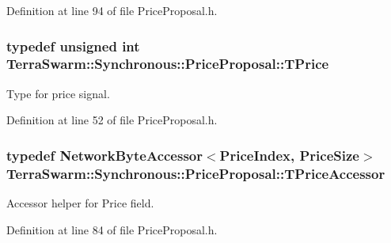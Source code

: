 Definition at line 94 of file Price\-Proposal.\-h.

\hypertarget{class_terra_swarm_1_1_synchronous_1_1_price_proposal_a663093d390a30942a07eee3681ff8fe2}{
\subsubsection[{T\-Price}]{\setlength{\rightskip}{0pt plus 5cm}typedef unsigned int {\bf Terra\-Swarm\-::\-Synchronous\-::\-Price\-Proposal\-::\-T\-Price}}}\label{class_terra_swarm_1_1_synchronous_1_1_price_proposal_a663093d390a30942a07eee3681ff8fe2}


Type for price signal. 



Definition at line 52 of file Price\-Proposal.\-h.

\hypertarget{class_terra_swarm_1_1_synchronous_1_1_price_proposal_a3f7f933da487e691a7d29c0227e1a9c6}{
\subsubsection[{T\-Price\-Accessor}]{\setlength{\rightskip}{0pt plus 5cm}typedef {\bf Network\-Byte\-Accessor}$<${\bf Price\-Index}, {\bf Price\-Size}$>$ {\bf Terra\-Swarm\-::\-Synchronous\-::\-Price\-Proposal\-::\-T\-Price\-Accessor}\hspace{0.3cm}{\ttfamily [private]}}}\label{class_terra_swarm_1_1_synchronous_1_1_price_proposal_a3f7f933da487e691a7d29c0227e1a9c6}


Accessor helper for Price field. 



Definition at line 84 of file Price\-Proposal.\-h.



